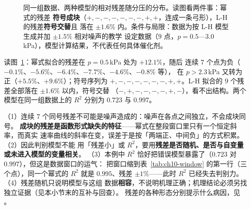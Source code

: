 \begin{figure}[htbp]
\centering
{}
\caption{同一组数据、两种模型的相对残差随分压的分布。读图看两件事：幂式的残差
\textbf{符号成块}（$+,-,-,-,-,-,-,+,+$，连成一条弓形），L-H 的残差\textbf{符号交替}且
落在 $\pm1.6\%$ 内。条件与局限：数据为按 L-H 模型生成并加 $\pm1.5\%$ 相对噪声的教学
设定数据（$9$ 点，$p=0.5$—$3.0$\,\unit{kPa}），模型计算结果，不代表任何具体催化剂。
\modelmark}
\label{fig:ch10-resid}
\end{figure}

\begin{obs}
读图~\ref{fig:ch10-resid}：幂式拟合的残差在 $p=0.5$\,\unit{kPa} 处为 $+12.1\%$，随后
连续 $7$ 个点为负（$-0.1\%$、$-5.6\%$、$-6.4\%$、$-7.7\%$、$-4.6\%$、$-0.8\%$ 等），
在 $p>2.3$\,\unit{kPa} 又转为正（$+5.5\%$、$+9.6\%$）；符号序列为
$+,-,-,-,-,-,-,+,+$。L-H 拟合的 $9$ 个残差全部落在 $\pm1.6\%$ 以内，符号交替
（$-,+,-,-,-,-,+,-$），看不出结构。两个模型在同一组数据上的 $R^2$ 分别为
$0.723$ 与 $0.997$。
\end{obs}

\begin{infer}
（1）连续 $7$ 个同号残差不可能是噪声造成的：噪声在各点之间独立，不会成块同号。
\textbf{成块的残差是函数形式缺失的特征}——幂式在整段窗口里只有一个恒定斜率，而真实
速率曲线的斜率在变，误差于是按「两端正、中间负」的方式积累。（2）因此判别模型不能
用「残差小」或 $R^2$，要用\textbf{残差是否随机、是否与自变量或未进入模型的变量相关}。
（3）本例中 $R^2$ 恰好把错误模型暴露了（$0.723$ 对 $0.997$），但这是数据窗口的运气：
把窗口缩到表~\ref{tab:ch10-window} 的第一行（三个点），同一个幂式的 $R^2$ 就是
$0.995$、残差 $\pm1\%$——此时 $R^2$ 已经失去判别力。（4）残差随机只说明模型与这组
数据\textbf{相容}，不说明机理正确；机理结论必须另找独立证据（见本小节末的互补与回查）。
残差的各种形态分别提示什么病因，见 。
\end{infer}

